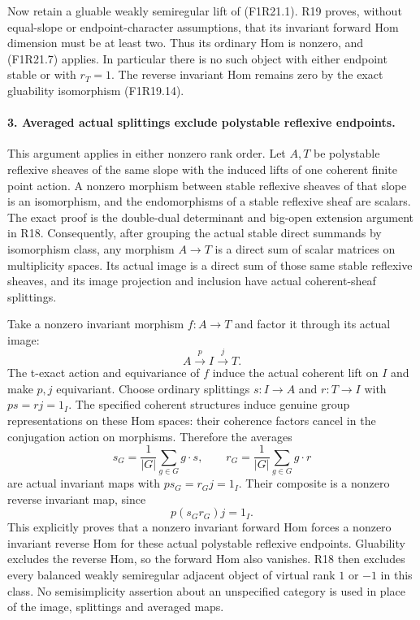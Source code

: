 Now retain a gluable weakly semiregular lift of (F1R21.1).
R19 proves, without equal-slope or endpoint-character
assumptions, that its invariant forward Hom dimension
must be at least two. Thus its ordinary Hom is nonzero,
and (F1R21.7) applies. In particular there is no such
object with either endpoint stable or with $r_T=1$.
The reverse invariant Hom remains zero by the exact
gluability isomorphism (F1R19.14).

\paragraph{3. Averaged actual splittings exclude polystable reflexive endpoints.}
This argument applies in either nonzero rank order.
Let $A,T$ be polystable reflexive sheaves of the same
slope with the induced lifts of one coherent finite
point action. A nonzero morphism between stable
reflexive sheaves of that slope is an isomorphism,
and the endomorphisms of a stable reflexive sheaf are
scalars. The exact proof is the double-dual determinant
and big-open extension argument in R18. Consequently,
after grouping the actual stable direct summands by
isomorphism class, any morphism $A\to T$ is a direct
sum of scalar matrices on multiplicity spaces. Its
actual image is a direct sum of those same stable
reflexive sheaves, and its image projection and inclusion
have actual coherent-sheaf splittings.

Take a nonzero invariant morphism $f:A\to T$ and
factor it through its actual image:
\[
                       A\xrightarrow{p}I\xrightarrow{j}T.
 \tag{F1R21.8}
\]
The t-exact action and equivariance of $f$ induce the
actual coherent lift on $I$ and make $p,j$ equivariant.
Choose ordinary splittings $s:I\to A$ and $r:T\to I$
with $ps=rj=1_I$. The specified coherent structures
induce genuine group representations on these Hom
spaces: their coherence factors cancel in the
conjugation action on morphisms. Therefore the averages
\[
 s_G=\frac1{|G|}\sum_{g\in G}g\cdot s,\qquad
 r_G=\frac1{|G|}\sum_{g\in G}g\cdot r
 \tag{F1R21.9}
\]
are actual invariant maps with $p s_G=r_G j=1_I$.
Their composite is a nonzero reverse invariant map,
since
\[
                      p(s_G r_G)j=1_I.
 \tag{F1R21.10}
\]
This explicitly proves that a nonzero invariant
forward Hom forces a nonzero invariant reverse Hom
for these actual polystable reflexive endpoints.
Gluability excludes the reverse Hom, so the forward
Hom also vanishes. R18 then excludes every balanced
weakly semiregular adjacent object of virtual rank
$1$ or $-1$ in this class. No semisimplicity assertion
about an unspecified category is used in place of
the image, splittings and averaged maps.

